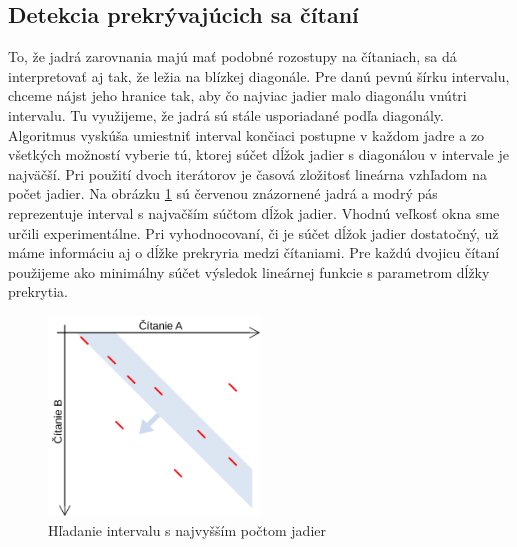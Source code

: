 \subsection{Detekcia prekrývajúcich sa čítaní}

To, že jadrá zarovnania majú mať podobné rozostupy na čítaniach, sa dá interpretovať aj tak, že ležia na blízkej diagonále. Pre danú pevnú šírku intervalu, chceme nájst jeho hranice tak, aby čo najviac jadier malo diagonálu vnútri intervalu. Tu využijeme, že jadrá sú stále usporiadané podľa diagonály. Algoritmus vyskúša umiestniť interval končiaci postupne v každom jadre a zo všetkých možností vyberie tú, ktorej súčet dĺžok jadier s diagonálou v intervale je najväčší. Pri použití dvoch iterátorov je časová zložitosť lineárna vzhľadom na počet jadier. Na obrázku \ref{fig:diagonalovy_interval} sú červenou znázornené jadrá a modrý pás reprezentuje interval s najvačším súčtom dĺžok jadier. Vhodnú veľkosť okna sme určili experimentálne. Pri vyhodnocovaní, či je súčet dĺžok jadier dostatočný, už máme informáciu aj o dĺžke prekryria medzi čítaniami. Pre každú dvojicu čítaní použijeme ako minimálny súčet výsledok lineárnej funkcie s parametrom dĺžky prekrytia.

\begin{figure}
    \centering
    \includegraphics[width=0.5\textwidth]{images/diagonalovy_interval.png}
    \caption{Hľadanie intervalu s najvyšším počtom jadier}
    \label{fig:diagonalovy_interval}
\end{figure} 
